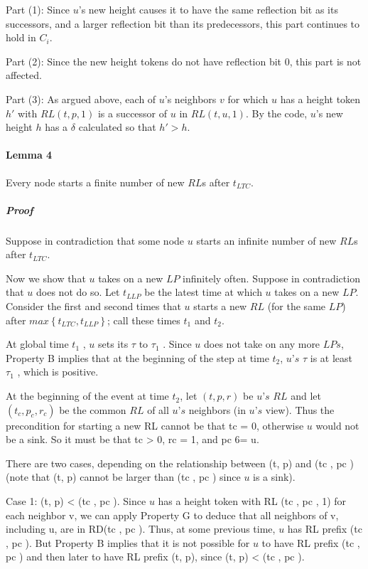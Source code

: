 Part (1): Since $u$'s new height causes it to have the same reflection bit as its successors, and a larger reflection bit than its predecessors, this part continues to hold in $C_i$.

Part (2): Since the new height tokens do not have reflection bit $0$, this part is not affected.

Part (3): As argued above, each of $u$'s neighbors $v$ for which $u$ has a height token $h'$ with $RL (t, p, 1)$ is a successor of $u$ in $RL (t, u, 1)$. By the code, $u$'s new height $h$ has a $\delta$ calculated so that $h' > h$.
\paragraph{Lemma 4} Every node starts a finite number of new $RL$s after $t_{LTC}$.

\subparagraph{Proof} Suppose in contradiction that some node $u$ starts an infinite number of new $RL$s after $t_{LTC}$.

Now we show that $u$ takes on a new $LP$ infinitely often. Suppose in contradiction that $u$ does not do so. Let $t_{LLP}$ be the latest time at which $u$ takes on a new $LP$. Consider the first and second times that $u$ starts a new $RL$ (for the same $LP$) after $max\left\lbrace t_{LTC}, t_{LLP} \right\rbrace $; call these times $t_1$ and $t_2$.

At global time $t_1$ , $u$ sets its $\tau$ to $\tau _1$ . Since $u$ does not take on any more $LPs$, Property B implies that at the beginning of the step at time $t_2$, $u’s$ $\tau$ is at least $\tau _1$ , which is positive.

At the beginning of the event at time $t_2$, let $(t, p, r)$ be $u’s$ $RL$ and let $(t_c, p_c, r_c)$ be the common $RL$ of all $u’s$ neighbors (in $u’s$ view). Thus the precondition for starting a new RL cannot be that tc = 0, otherwise $u$ would not be a sink. So it must be that tc > 0, rc = 1, and pc 6= u.

There are two cases, depending on the relationship between (t, p) and (tc , pc ) (note that (t, p) cannot be larger than (tc , pc ) since $u$ is a sink).

Case 1: (t, p) < (tc , pc ). Since $u$ has a height token with RL (tc , pc , 1) for each neighbor v, we can apply Property G to deduce that all neighbors of v, including u, are in RD(tc , pc ). Thus, at some previous time, $u$ has RL prefix (tc , pc ). But Property B implies that it is not possible for $u$ to have RL prefix (tc , pc ) and then later to have RL prefix (t, p), since (t, p) < (tc , pc ).

